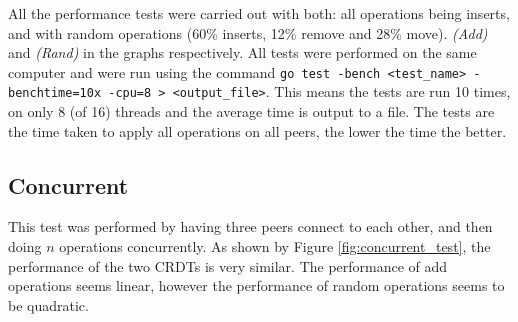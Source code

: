 \documentclass[12pt]{report}
\begin{document}
All the performance tests were carried out with both: all operations being inserts, and with random operations (60\% inserts, 12\% remove and 28\% move). \textit{(Add)} and \textit{(Rand)} in the graphs respectively. All tests were performed on the same computer and were run using the command \texttt{go test -bench <test\_name> -benchtime=10x -cpu=8 > <output\_file>}. This means the tests are run 10 times, on only 8 (of 16) threads and the average time is output to a file. The tests are the time taken to apply all operations on all peers, the lower the time the better.

\subsection{Concurrent}
This test was performed by having three peers connect to each other, and then doing $n$ operations concurrently. As shown by Figure \ref{fig:concurrent_test}, the performance of the two CRDTs is very similar. The performance of add operations seems linear, however the performance of random operations seems to be quadratic.
\end{document}
